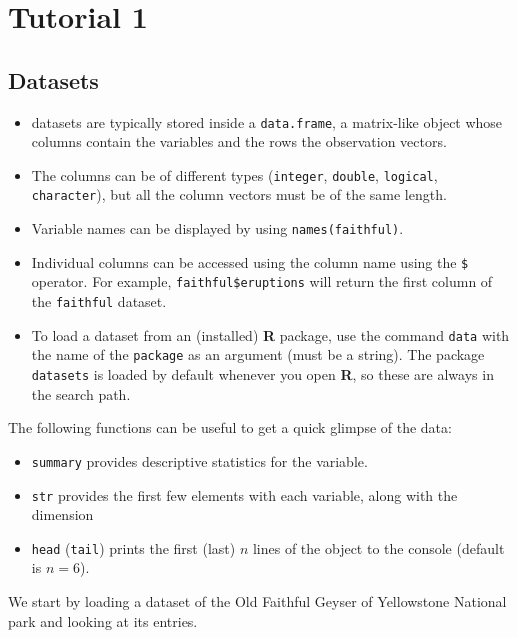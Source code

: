 \documentclass[]{book}
\providecommand{\tightlist}{%
  \setlength{\itemsep}{0pt}\setlength{\parskip}{0pt}}
\theoremstyle{definition}
\theoremstyle{definition}
\theoremstyle{definition}
\theoremstyle{remark}
\begin{document}
\section{Tutorial 1}\label{week1}

\subsection{Datasets}\label{datasets}

\begin{itemize}
\tightlist
\item
  datasets are typically stored inside a \texttt{data.frame}, a
  matrix-like object whose columns contain the variables and the rows
  the observation vectors.
\item
  The columns can be of different types (\texttt{integer},
  \texttt{double}, \texttt{logical}, \texttt{character}), but all the
  column vectors must be of the same length.
\item
  Variable names can be displayed by using \texttt{names(faithful)}.
\item
  Individual columns can be accessed using the column name using the
  \texttt{\$} operator. For example, \texttt{faithful\$eruptions} will
  return the first column of the \texttt{faithful} dataset.
\item
  To load a dataset from an (installed) \textbf{R} package, use the
  command \texttt{data} with the name of the \texttt{package} as an
  argument (must be a string). The package \texttt{datasets} is loaded
  by default whenever you open \textbf{R}, so these are always in the
  search path.
\end{itemize}

The following functions can be useful to get a quick glimpse of the
data:

\begin{itemize}
\tightlist
\item
  \texttt{summary} provides descriptive statistics for the variable.
\item
  \texttt{str} provides the first few elements with each variable, along
  with the dimension
\item
  \texttt{head} (\texttt{tail}) prints the first (last) \(n\) lines of
  the object to the console (default is \(n=6\)).
\end{itemize}

We start by loading a dataset of the Old Faithful Geyser of Yellowstone
National park and looking at its entries.
\end{document}
